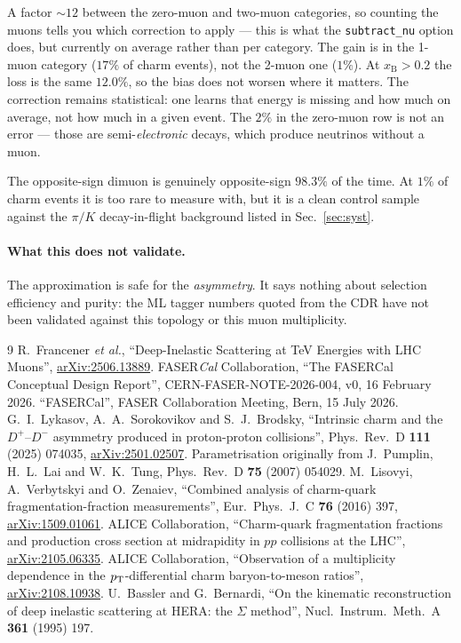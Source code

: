 \documentclass[11pt,a4paper]{article}
\newcommand{\xB}{x_{\mathrm{B}}}
\begin{document}
\noindent
A factor ${\sim}12$ between the zero-muon and two-muon categories, so counting
the muons tells you which correction to apply --- this is what the
\texttt{subtract\_nu} option does, but currently on average rather than per
category. The gain is in the 1-muon category ($17\%$ of charm events), not the
2-muon one ($1\%$). At $\xB>0.2$ the loss is the same $12.0\%$, so the bias does
not worsen where it matters. The correction remains statistical: one learns that
energy is missing and how much on average, not how much in a given event. The
$2\%$ in the zero-muon row is not an error --- those are semi-\emph{electronic}
decays, which produce neutrinos without a muon.

The opposite-sign dimuon is genuinely opposite-sign $98.3\%$ of the time. At
$1\%$ of charm events it is too rare to measure with, but it is a clean control
sample against the $\pi/K$ decay-in-flight background listed in
Sec.~\ref{sec:syst}.

\paragraph{What this does not validate.} The approximation is safe for the
\emph{asymmetry}. It says nothing about selection efficiency and purity: the ML
tagger numbers quoted from the CDR have not been validated against this topology
or this muon multiplicity.

\begin{thebibliography}{9}
 R.~Francener \emph{et al.},
  ``Deep-Inelastic Scattering at TeV Energies with LHC Muons'',
  \href{https://arxiv.org/abs/2506.13889}{arXiv:2506.13889}.
 FASER\emph{Cal} Collaboration,
  ``The FASERCal Conceptual Design Report'', CERN-FASER-NOTE-2026-004, v0,
  16 February 2026.
 ``FASERCal'', FASER Collaboration Meeting, Bern, 15 July 2026.
 G.~I.~Lykasov, A.~A.~Sorokovikov and S.~J.~Brodsky,
  ``Intrinsic charm and the $D^+$--$D^-$ asymmetry produced in proton-proton
  collisions'', Phys.\ Rev.\ D \textbf{111} (2025) 074035,
  \href{https://arxiv.org/abs/2501.02507}{arXiv:2501.02507}.
  Parametrisation originally from J.~Pumplin, H.~L.~Lai and W.~K.~Tung,
  Phys.\ Rev.\ D \textbf{75} (2007) 054029.
 M.~Lisovyi, A.~Verbytskyi and O.~Zenaiev,
  ``Combined analysis of charm-quark fragmentation-fraction measurements'',
  Eur.\ Phys.\ J.\ C \textbf{76} (2016) 397,
  \href{https://arxiv.org/abs/1509.01061}{arXiv:1509.01061}.
 ALICE Collaboration,
  ``Charm-quark fragmentation fractions and production cross section at
  midrapidity in $pp$ collisions at the LHC'',
  \href{https://arxiv.org/abs/2105.06335}{arXiv:2105.06335}.
 ALICE Collaboration,
  ``Observation of a multiplicity dependence in the $p_{\rm T}$-differential
  charm baryon-to-meson ratios'',
  \href{https://arxiv.org/abs/2108.10938}{arXiv:2108.10938}.
 U.~Bassler and G.~Bernardi,
  ``On the kinematic reconstruction of deep inelastic scattering at HERA:
  the $\Sigma$ method'', Nucl.\ Instrum.\ Meth.\ A \textbf{361} (1995) 197.
\end{thebibliography}
\end{document}
